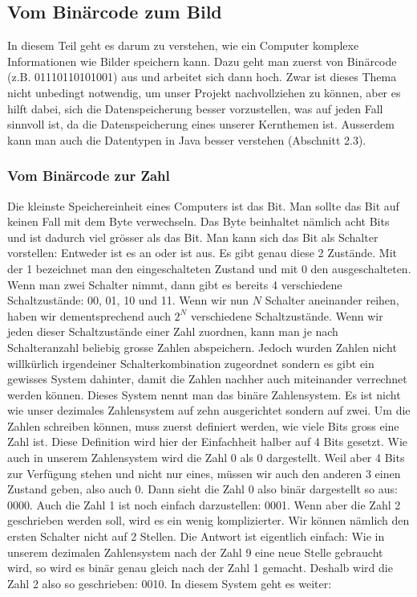 \subsection{Vom Binärcode zum Bild}


In diesem Teil geht es darum zu verstehen, wie ein Computer komplexe Informationen wie Bilder speichern kann. Dazu geht man zuerst von Binärcode (z.B. 01110110101001) aus und arbeitet sich dann hoch. Zwar ist dieses Thema nicht unbedingt notwendig, um unser Projekt nachvollziehen zu können, aber es hilft dabei, sich die Datenspeicherung besser vorzustellen, was auf jeden Fall sinnvoll ist, da die Datenspeicherung eines unserer Kernthemen ist. Ausserdem kann man auch die Datentypen in Java besser verstehen (Abschnitt 2.3).


\subsubsection{Vom Binärcode zur Zahl}


Die kleinste Speichereinheit eines Computers ist das Bit. Man sollte das Bit auf keinen Fall mit dem Byte verwechseln. Das Byte beinhaltet nämlich acht Bits und ist dadurch viel grösser als das Bit. Man kann sich das Bit als Schalter vorstellen: Entweder ist es an oder ist aus. Es gibt genau diese 2 Zustände. Mit der 1 bezeichnet man den eingeschalteten Zustand und mit 0 den ausgeschalteten. Wenn man zwei Schalter nimmt, dann gibt es bereits 4 verschiedene Schaltzustände: 00, 01, 10 und 11. Wenn wir nun $N$ Schalter aneinander reihen, haben wir dementsprechend auch $2^N$ verschiedene Schaltzustände. Wenn wir jeden dieser Schaltzustände einer Zahl zuordnen, kann man je nach Schalteranzahl beliebig grosse Zahlen abspeichern. Jedoch wurden Zahlen nicht willkürlich irgendeiner Schalterkombination zugeordnet sondern es gibt ein gewisses System dahinter, damit die Zahlen nachher auch miteinander verrechnet werden können. Dieses System nennt man das binäre Zahlensystem. Es ist nicht wie unser dezimales Zahlensystem auf zehn ausgerichtet sondern auf zwei. Um die Zahlen schreiben können, muss zuerst definiert werden, wie viele Bits gross eine Zahl ist. Diese Definition wird hier der Einfachheit halber auf 4 Bits gesetzt. Wie auch in unserem Zahlensystem wird die Zahl 0 als 0 dargestellt. Weil aber 4 Bits zur Verfügung stehen und nicht nur eines, müssen wir auch den anderen 3 einen Zustand geben, also auch 0. Dann sieht die Zahl 0 also binär dargestellt so aus: 0000. Auch die Zahl 1 ist noch einfach darzustellen: 0001. Wenn aber die Zahl 2 geschrieben werden soll, wird es ein wenig komplizierter. Wir können nämlich den ersten Schalter nicht auf 2 Stellen. Die Antwort ist eigentlich einfach: Wie in unserem dezimalen Zahlensystem nach der Zahl 9 eine neue Stelle gebraucht wird, so wird es binär genau gleich nach der Zahl 1 gemacht. Deshalb wird die Zahl 2 also so geschrieben: 0010. In diesem System geht es weiter: \\


